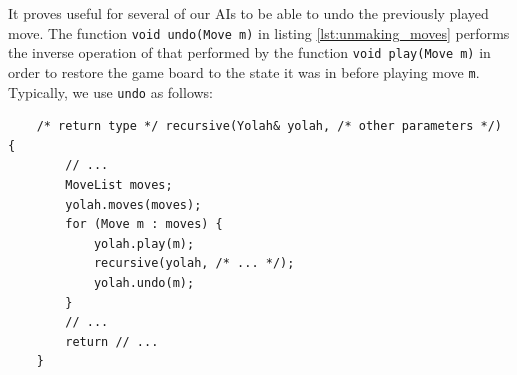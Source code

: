 \documentclass[12pt,a4paper,twoside,openright]{book}
\begin{document}
It proves useful for several of our AIs to be able to undo the previously played move. The function \texttt{void undo(Move m)} in listing \ref{lst:unmaking_moves} performs the inverse operation of that performed by the function \texttt{void play(Move m)} in order to restore the game board to the state it was in before playing move \texttt{m}. Typically, we use \texttt{undo} as follows:
\begin{verbatim}
    /* return type */ recursive(Yolah& yolah, /* other parameters */) {
        // ...
        MoveList moves;
        yolah.moves(moves);
        for (Move m : moves) {
            yolah.play(m);
            recursive(yolah, /* ... */);
            yolah.undo(m);
        }
        // ...
        return // ...
    }    
\end{verbatim}
\end{document}
